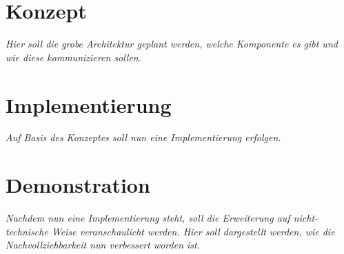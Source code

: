 	
\section{Konzept}

	\textit{Hier soll die grobe Architektur geplant werden, welche Komponente es gibt und wie diese kommunizieren sollen.}

\section{Implementierung}

	\textit{Auf Basis des Konzeptes soll nun eine Implementierung erfolgen.}

\section{Demonstration}

	\textit{Nachdem nun eine Implementierung steht, soll die Erweiterung auf nicht-technische Weise veranschaulicht werden. Hier soll dargestellt werden, wie die Nachvollziehbarkeit nun verbessert worden ist.}